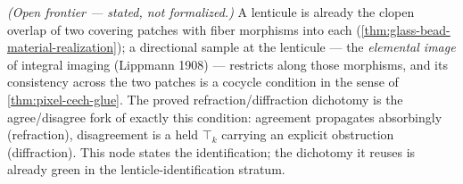 \begin{theorem}\label{thm:lenticule-elemental-cocycle}\notready{}
\emph{(Open frontier --- stated, not formalized.)} A lenticule is already the clopen
overlap of two covering patches with fiber morphisms into each
(\cref{thm:glass-bead-material-realization}); a directional sample at the lenticule ---
the \emph{elemental image} of integral imaging (Lippmann 1908) --- restricts along those
morphisms, and its consistency across the two patches is a cocycle condition in the sense
of \cref{thm:pixel-cech-glue}. The proved refraction/diffraction dichotomy is the
agree/disagree fork of exactly this condition: agreement propagates absorbingly
(refraction), disagreement is a held $\top_k$ carrying an explicit obstruction
(diffraction). This node states the identification; the dichotomy it reuses is already
green in the lenticle-identification stratum.
\end{theorem}
